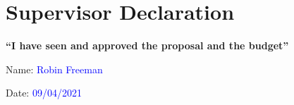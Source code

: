 \documentclass[11pt]{article}
\begin{document}
\begin{onehalfspace}
\begin{table}[ht]
\begin{tabular}{ |P{0.15\linewidth}|P{0.22\linewidth}|P{0.45\linewidth}|c| }
    \hline %
    \end{tabular}
    \label{table:nonlin} %
  \end{table}
  
  \section{Supervisor Declaration}
  
  \begingroup
  \centering
  \textbf{``I have seen and approved the proposal and the budget''}
  
  \bigskip 
  
  \centering
  Name: \textcolor{blue}{\large Robin Freeman}
  
  \vspace{\baselineskip} 
  \centering
  Date: \textcolor{blue}{09/04/2021}
 
  
  \endgroup
  
  
  \end{onehalfspace}
  
\end{document}
